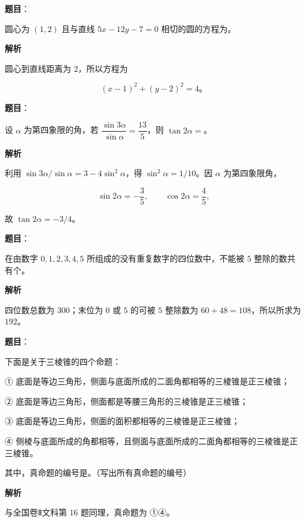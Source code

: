 \begin{answer}

\textbf{题目}：

圆心为 $(1,2)$ 且与直线 $5x-12y-7=0$ 相切的圆的方程为\gkblank{}。

\textbf{解析}

圆心到直线距离为 $2$，所以方程为

\nopagebreak[4]
\[
(x-1)^2+(y-2)^2=4\text{。}
\]


\end{answer}
\begin{answer}

\textbf{题目}：

设 $\alpha$ 为第四象限的角，若 $\dfrac{\sin3\alpha}{\sin\alpha}=\dfrac{13}{5}$，则 $\tan2\alpha=$\gkblank{}。

\textbf{解析}

利用 $\sin3\alpha/\sin\alpha=3-4\sin^2\alpha$，得 $\sin^2\alpha=1/10$。因 $\alpha$ 为第四象限角，

\nopagebreak[4]
\[
\sin2\alpha=-\frac35,\qquad \cos2\alpha=\frac45,
\]

故 $\tan2\alpha=-3/4$。


\end{answer}
\begin{answer}

\textbf{题目}：

在由数字 $0,1,2,3,4,5$ 所组成的没有重复数字的四位数中，不能被 $5$ 整除的数共有\gkblank{}个。

\textbf{解析}

四位数总数为 $300$；末位为 $0$ 或 $5$ 的可被 $5$ 整除数为 $60+48=108$，所以所求为 $192$。


\end{answer}
\begin{answer}

\textbf{题目}：

下面是关于三棱锥的四个命题：

① 底面是等边三角形，侧面与底面所成的二面角都相等的三棱锥是正三棱锥；

② 底面是等边三角形，侧面都是等腰三角形的三棱锥是正三棱锥；

③ 底面是等边三角形，侧面的面积都相等的三棱锥是正三棱锥；

④ 侧棱与底面所成的角都相等，且侧面与底面所成的二面角都相等的三棱锥是正三棱锥。

其中，真命题的编号是\gkblank{}。（写出所有真命题的编号）

\textbf{解析}

与全国卷Ⅱ文科第 16 题同理，真命题为 ①④。


\end{answer}
